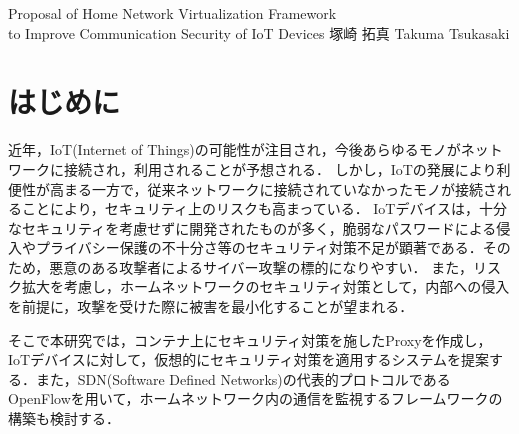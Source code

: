 \documentclass[a4paper,10pt,twocolumn,uplatex]{jsarticle}
\date{11}
\begin{document}
{Proposal of Home Network Virtualization Framework\\to Improve Communication Security of IoT Devices}
{塚崎 拓真}
{Takuma Tsukasaki}

\section{はじめに}
近年，IoT(Internet of Things)の可能性が注目され，今後あらゆるモノがネットワークに接続され，利用されることが予想される．
しかし，IoTの発展により利便性が高まる一方で，従来ネットワークに接続されていなかったモノが接続されることにより，セキュリティ上のリスクも高まっている．
IoTデバイスは，十分なセキュリティを考慮せずに開発されたものが多く，脆弱なパスワードによる侵入やプライバシー保護の不十分さ等のセキュリティ対策不足が顕著である\cite{owasp}．そのため，悪意のある攻撃者によるサイバー攻撃の標的になりやすい．
また，リスク拡大を考慮し，ホームネットワークのセキュリティ対策として，内部への侵入を前提に，攻撃を受けた際に被害を最小化することが望まれる．\par
そこで本研究では，コンテナ上にセキュリティ対策を施したProxyを作成し，IoTデバイスに対して，仮想的にセキュリティ対策を適用するシステムを提案する．また，SDN(Software Defined Networks)の代表的プロトコルであるOpenFlowを用いて，ホームネットワーク内の通信を監視するフレームワークの構築も検討する．
\end{document}
